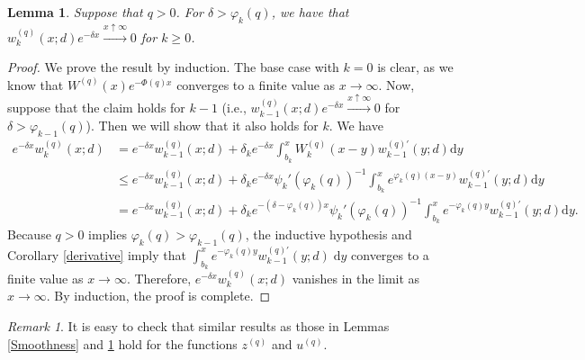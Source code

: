 \documentclass[12pt,reqno]{amsart}
\newcommand{\red}{\textcolor[rgb]{1.00,0.00,0.00}}
\newcommand{\blue}{\textcolor[rgb]{0.00,0.00,1.00}}
\newcommand{\green}{\textcolor[rgb]{0.00,0.70,.30}}
\newtheorem{lemma}[theorem]{Lemma}
\theoremstyle{definition}
\theoremstyle{remark}
\newtheorem{remark}[theorem]{Remark}
\newcommand{\md}{\mathrm{d}}
\newcommand{\wq}{w^{(q)}}
\begin{document}
\begin{lemma} \label{lemma_convergence_assumptotics_w}
Suppose that $q > 0$. For $\delta > \varphi_k(q)$, we have that $w^{(q)}_k (x;d) e^{-\delta x} \xrightarrow{x \uparrow \infty} 0$ for $k \geq 0$. 
\end{lemma}
\begin{proof}
We prove the result by induction.
The base case with $k=0$ is clear, as we know that $W^{(q)}(x) e^{-\Phi(q)x}$ converges to a finite value as $x\to\infty$. Now, suppose that the claim holds for 
$k-1$ (i.e., $w^{(q)}_{k-1} (x;d) e^{-\delta x} \xrightarrow{x \uparrow \infty} 0$ for $\delta > \varphi_{k-1}(q)$).
Then we will show that it also holds for $k$. We have
\begin{align*}
 e^{-\delta x} \wq_k(x;d)&= e^{-\delta x} \wq_{k-1}(x;d)+\delta_{k} e^{-\delta x} \int^{x}_{b_{k}}W_k^{\left(q\right)}(x-y)w_{k-1}^{(q)\prime}(y;d)\md y \\
&\leq  e^{-\delta x} \wq_{k-1}(x;d)+\delta_{k} e^{-\delta x} \psi_k'(\varphi_k(q))^{-1}\int^{x}_{b_{k}} e^{\varphi_k(q)(x-y)}w_{k-1}^{(q)\prime}(y;d)\md y \\
&=  e^{-\delta x} \wq_{k-1}(x;d)+\delta_{k} e^{-(\delta - \varphi_k(q)) x} \psi_k'(\varphi_k(q))^{-1}\int^{x}_{b_{k}} e^{-\varphi_k(q)y}w_{k-1}^{(q)\prime}(y;d)\md y.
   \end{align*}
   Because $q > 0$ implies $\varphi_k (q) > \varphi_{k-1}(q)$, the inductive hypothesis and  Corollary \ref{derivative} imply that
	$\int^{x}_{b_{k}} e^{-\varphi_k(q)y}w_{k-1}^{(q)\prime}(y;d)\;\md y$ converges to a finite value as 
	$x \rightarrow \infty$. Therefore, $e^{-\delta x} \wq_k(x;d)$ vanishes in the limit as $x \rightarrow \infty$.  
	By induction, the proof is complete. 
	
\end{proof}

\begin{remark}\label{remark_convergence_assumptotics_w}
  It is easy to check that similar results as those in Lemmas \ref{Smoothness} and \ref{lemma_convergence_assumptotics_w}
  hold for the functions $z^{(q)}$ and $u^{(q)}$.
\end{remark}


\end{document}
